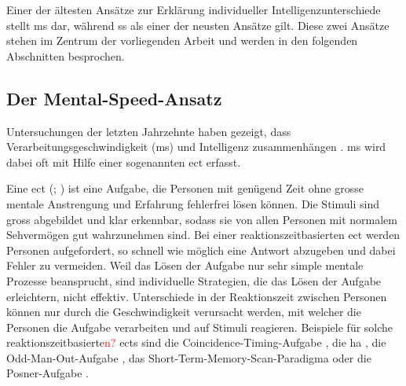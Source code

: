 \documentclass[11pt, twoside, a4paper]{book}		%
\begin{document}
Einer der ältesten Ansätze zur Erklärung individueller Intelligenzunterschiede stellt \gls{ms} dar, während \gls{ss} als einer der neusten Ansätze gilt. Diese zwei Ansätze stehen im Zentrum der vorliegenden Arbeit und werden in den folgenden Abschnitten besprochen.


\subsection{Der Mental-Speed-Ansatz \label{subsec:Der_Mental-Speed-Ansatz}}

Untersuchungen der letzten Jahrzehnte  haben gezeigt, dass Verarbeitungsgeschwindigkeit (\gls{ms}) und Intelligenz zusammenhängen \citep[für Übersichtsarbeiten siehe][]{Deary2000a, Jensen2006, Sheppard2008}. \gls{ms} wird dabei oft mit Hilfe einer sogenannten \gls{ect} erfasst.

Eine \gls{ect} (\citealp[S. 11]{Carroll1993}; \citealp[S. 203--209]{Jensen1998a}) ist eine Aufgabe, die Personen mit genügend Zeit ohne grosse mentale Anstrengung und Erfahrung fehlerfrei lösen können. Die Stimuli sind gross abgebildet und klar erkennbar, sodass sie von allen Personen mit normalem Sehvermögen gut wahrzunehmen sind. 
Bei einer reaktionszeitbasierten \gls{ect} werden Personen aufgefordert, so schnell wie möglich eine Antwort abzugeben und dabei Fehler zu vermeiden. 
Weil das Lösen der Aufgabe nur sehr simple mentale Prozesse beansprucht, sind individuelle Strategien, die das Lösen der Aufgabe erleichtern, nicht effektiv. Unterschiede in der Reaktionszeit zwischen Personen können nur durch die Geschwindigkeit verursacht werden, mit welcher die Personen die Aufgabe verarbeiten und auf Stimuli reagieren.
Beispiele für solche reaktionszeitbasierte\textcolor{red}{n?} \glspl{ect} sind
die Coincidence-Timing-Aufgabe \citep[bei welcher ein räumliches Zusammentreffen von zwei Stimuli so rasch als möglich erkannt werden muss;][]{Smith1987a}, 
die \gls{ha} \citep[zur Erfassung einfacher Reaktionszeit und der Reaktionszeit für eine Mehrfachauswahl;][]{Hick1952}, 
die Odd-Man-Out-Aufgabe \citep[zur Erfassung der Reaktionszeit für eine Mehrfachauswahl;][]{Frearson1986}, das Short-Term-Memory-Scan-Paradigma \citep[zur Erfassung der benötigten Zeit für einen Zugriff auf das Kurzzeitgedächtnis;][]{Sternberg1966, Sternberg1969}
oder die Posner-Aufgabe \citep[zur Erfassung der benötigten Zeit für einen Zugriff auf das Langzeitgedächtnis;][]{Posner1969}.
\end{document}
